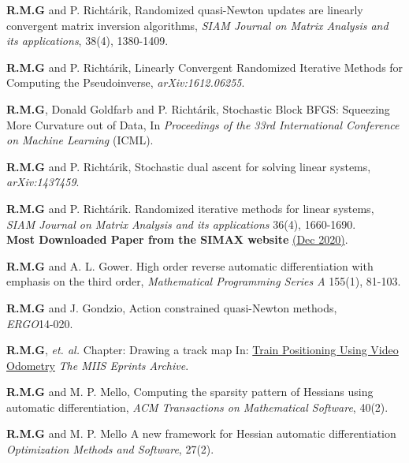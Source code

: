 \begin{bibsection}
\item[2017] { \bf R.M.G}  and P. Richt\'arik,
Randomized quasi-Newton updates are linearly convergent matrix inversion algorithms,  \emph{SIAM Journal on Matrix Analysis and its applications}, 38(4), 1380-1409.

\item[2016] { \bf R.M.G}  and P. Richt\'arik,
Linearly Convergent Randomized Iterative Methods for Computing the Pseudoinverse,
\emph{arXiv:1612.06255}.

\item { \bf R.M.G},  Donald Goldfarb and P. Richt\'arik, Stochastic Block BFGS: Squeezing More Curvature out of Data,
In \emph{Proceedings of the 33rd International Conference on Machine Learning} (ICML).



\item[2015] { \bf R.M.G} and P. Richt\'arik,
Stochastic dual ascent for solving linear systems, %
\emph{arXiv:1437459}.

 \item { \bf R.M.G} and P. Richt\'arik.
Randomized iterative methods for linear systems, \\
 \emph{SIAM Journal on Matrix Analysis and its applications} 36(4), 1660-1690.\\
 {\bf Most Downloaded Paper from the SIMAX website } \href{http://epubs.siam.org/action/showMostReadArticles?journalCode=sjmael&}{(Dec 2020)}.
 
\item[2014] { \bf R.M.G} and A. L. Gower.
High order reverse automatic differentiation with emphasis on the third order,
 \emph{Mathematical Programming Series A}  155(1), 81-103.
 
    \item { \bf R.M.G} and J. Gondzio,
 Action constrained quasi-Newton methods,  \\
\emph{ERGO}14-020.

    \item { \bf R.M.G}, \emph{et. al.}
     Chapter: Drawing a track map
    In: \href{http://www.maths-in-industry.org/miis/672/}{Train Positioning Using Video Odometry}
\emph{The MIIS Eprints Archive}.

\item { \bf R.M.G} and M. P. Mello,
 Computing the sparsity pattern of Hessians using automatic differentiation,
  \emph{ACM Transactions on Mathematical Software}, 40(2).

\item[2012] { \bf R.M.G} and M. P. Mello
A new framework for Hessian automatic differentiation
\emph{Optimization Methods and Software}, 27(2). %
\end{bibsection}
